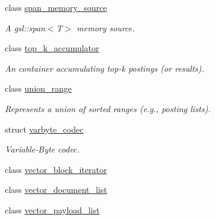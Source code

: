 \begin{DoxyCompactItemize}
class \mbox{\hyperlink{classirk_1_1span__memory__source}{span\+\_\+memory\+\_\+source}}
\begin{DoxyCompactList}\small\item\em A gsl\+::span$<$\+T$>$ memory source. \end{DoxyCompactList}\item 
class \mbox{\hyperlink{classirk_1_1top__k__accumulator}{top\+\_\+k\+\_\+accumulator}}
\begin{DoxyCompactList}\small\item\em An container accumulating top-\/k postings (or results). \end{DoxyCompactList}\item 
class \mbox{\hyperlink{classirk_1_1union__range}{union\+\_\+range}}
\begin{DoxyCompactList}\small\item\em Represents a union of sorted ranges (e.\+g., posting lists). \end{DoxyCompactList}\item 
struct \mbox{\hyperlink{structirk_1_1varbyte__codec}{varbyte\+\_\+codec}}
\begin{DoxyCompactList}\small\item\em Variable-\/\+Byte codec. \end{DoxyCompactList}\item 
class \mbox{\hyperlink{classirk_1_1vector__block__iterator}{vector\+\_\+block\+\_\+iterator}}
\item 
class \mbox{\hyperlink{classirk_1_1vector__document__list}{vector\+\_\+document\+\_\+list}}
\item 
class \mbox{\hyperlink{classirk_1_1vector__payload__list}{vector\+\_\+payload\+\_\+list}}
\end{DoxyCompactItemize}
